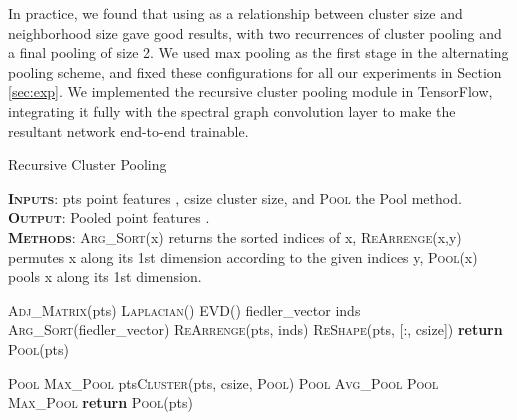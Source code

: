 \documentclass[runningheads]{llncs}
\begin{document}
In practice, we found that using  as a relationship between cluster size and neighborhood size gave good results, with two recurrences of cluster pooling and a final pooling of size 2. We used max pooling as the first stage in the alternating pooling scheme, and fixed these configurations for all our experiments in Section \ref{sec:exp}. We implemented the recursive cluster pooling module in TensorFlow, integrating it fully with the spectral graph convolution layer to make the resultant network end-to-end trainable.


\medskip
\begin{algorithm}[t]
	\small
	\caption{Recursive Cluster Pooling}
	\label{algorithm1}
	\hspace*{\algorithmicindent}\textbf{\textsc{Inputs}}: pts  point features , csize  cluster size, and \textsc{Pool}  the Pool method.\\
	\hspace*{\algorithmicindent}\textbf{\textsc{Output}}: Pooled point features .\\
	\hspace*{\algorithmicindent}\textbf{\textsc{Methods}}: \textsc{Arg\_Sort}(x) returns the sorted indices of x, \textsc{ReArrenge}(x,y) permutes x along its 1st dimension according to the given indices y,  \textsc{Pool}(x) pools x along its 1st dimension.

	\begin{multicols}{2}
		
		\begin{algorithmic}
			\State  \textsc{Adj\_Matrix}(pts)
			\State  \textsc{Laplacian()}
			\State  \textsc{EVD}()
			\State fiedler\_vector \State inds \textsc{Arg\_Sort}(fiedler\_vector)
			\State \textsc{ReArrenge}(pts, inds)
			\State \textsc{ReShape}(pts, [:, csize])
			\State \textbf{return} \textsc{Pool}(pts)\EndProcedure

			\State \textsc{Pool} \textsc{Max\_Pool}
			\State pts\textsc{Cluster}(pts, csize, \textsc{Pool})
			\State \textsc{Pool} \textsc{Avg\_Pool}
			\Else
			\State \textsc{Pool} \textsc{Max\_Pool}
			\EndIf
			\EndWhile
			\State \textbf{return}  \textsc{Pool}(pts)\EndProcedure
			
		\end{algorithmic}
	\end{multicols}
\end{algorithm}
\end{document}
